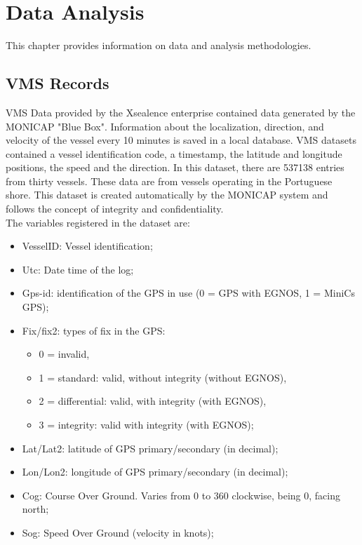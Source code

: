 % 
% 
%
\chapter{Data Analysis}
\label{cha:data}
This chapter provides information on data and analysis methodologies.



\section{VMS Records} %
\label{sec:vms_records}

VMS Data provided by the Xsealence \cite{WEBSITE:Xsealence} enterprise contained data generated by the MONICAP \cite{WEBSITE:MonicapXsealence} "Blue Box". Information about the localization, direction, and velocity of the vessel every 10 minutes is saved in a local database. VMS datasets contained a vessel identification code, a timestamp, the latitude and longitude positions, the speed and the direction. In this dataset, there are 537138 entries from thirty vessels. These data are from vessels operating in the Portuguese shore. 
This dataset is created automatically by the MONICAP system and follows the concept of integrity and confidentiality.\\
The variables registered in the dataset are:
\begin{itemize}
\item VesselID: Vessel identification;
\item Utc: Date time of the log;
\item Gps-id: identification of the GPS in use (0 = GPS with EGNOS, 1 = MiniCs GPS);
\item Fix/fix2: types of fix in the GPS:
\begin{itemize}
\item 0 = invalid, 
\item 1 = standard: valid, without integrity (without EGNOS), 
\item 2 = differential: valid, with integrity (with EGNOS), 
\item 3 = integrity: valid with integrity (with EGNOS);
\end{itemize}
\item Lat/Lat2: latitude of GPS primary/secondary (in decimal);
\item Lon/Lon2: longitude of GPS primary/secondary (in decimal);
\item Cog: Course Over Ground. Varies from 0 to 360 clockwise, being 0, facing north;
\item Sog: Speed Over Ground (velocity in knots);


\end{itemize}


